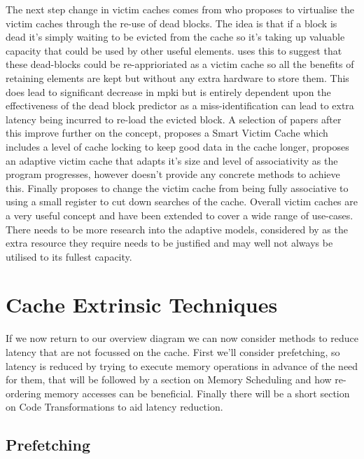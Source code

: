 The next step change in victim caches comes from \citet{khanUsingDeadBlocks2010} who proposes to virtualise the victim caches through the re-use of dead blocks. The idea is that if a block is dead it's simply waiting to be evicted from the cache so it's taking up valuable capacity that could be used by other useful elements. \citeauthor{khanUsingDeadBlocks2010} uses this to suggest that these dead-blocks could be re-apprioriated as a victim cache so all the benefits of retaining elements are kept but without any extra hardware to store them. This does lead to significant decrease in \gls{mpki} but is entirely dependent upon the effectiveness of the dead block predictor as a miss-identification can lead to extra latency being incurred to re-load the evicted block. A selection of papers after this improve further on the concept, \citet{asaduzzamanEffectiveLockingfreeCaching2014} proposes a Smart Victim Cache which includes a level of cache locking to keep good data in the cache longer, \citet{navarroAdaptiveVictimCache2014} proposes an adaptive victim cache that adapts it's size and level of associativity as the program progresses, however doesn't provide any concrete methods to achieve this. Finally \citet{subhaArchitectureVictimCache2016} proposes to change the victim cache from being fully associative to using a small register to cut down searches of the cache. Overall victim caches are a very useful concept and have been extended to cover a wide range of use-cases. There needs to be more research into the adaptive models, considered by \citet{navarroAdaptiveVictimCache2014} as the extra resource they require needs to be justified and may well not always be utilised to its fullest capacity.

\section{Cache Extrinsic Techniques}

If we now return to our overview diagram we can now consider methods to reduce latency that are not focussed on the cache. First we'll consider prefetching, so latency is reduced by trying to execute memory operations in advance of the need for them, that will be followed by a section on Memory Scheduling and how re-ordering memory accesses can be beneficial. Finally there will be a short section on Code Transformations to aid latency reduction.

\subsection{Prefetching}

